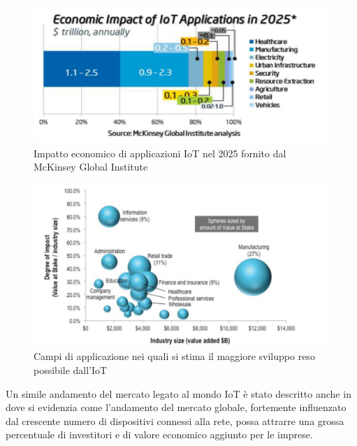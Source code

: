 \begin{figure}
	\begin{center}
		\includegraphics[width=0.9\columnwidth]{images/numbers_economic.png}
	\end{center}
	\caption{Impatto economico di applicazioni IoT nel 2025 fornito dal McKinsey Global Institute \cite{famous:mck}}
	\label{fig:numbers_economic}
\end{figure}
\begin{figure}
	\begin{center}
		\includegraphics[width=0.9\columnwidth]{images/numbers_where.png}
	\end{center}
	\caption{Campi di applicazione nei quali si stima il maggiore sviluppo reso possibile dall'IoT \cite{famous:paper_cisco_2013}}
	\label{fig:numbers_where}
\end{figure}
Un simile andamento del mercato legato al mondo IoT è stato descritto anche in \cite{famous:paper_indian_market} dove si evidenzia come l'andamento del mercato globale, fortemente influenzato dal crescente numero di dispositivi connessi alla rete, possa attrarre una grossa percentuale di investitori e di valore economico aggiunto per le imprese.

